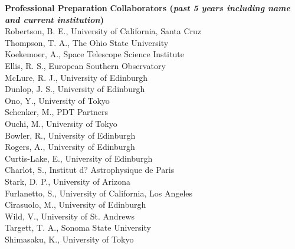 \documentclass[11pt,letterpaper,english]{article}
\begin{document}
\begin{flushleft} {\bf Professional Preparation}
\vspace{-6pt}
{\bf Collaborators ({\emph{past 5 years including name and current institution}})} 
{\parindent 16pt \\
Robertson, B. E., University of California, Santa Cruz \\
Thompson, T. A., The Ohio State University \\
Koekemoer, A., Space Telescope Science Institute \\
Ellis, R. S., European Southern Observatory \\
McLure, R. J., University of Edinburgh \\
Dunlop, J. S., University of Edinburgh \\
Ono, Y., University of Tokyo \\
Schenker, M., PDT Partners \\
Ouchi, M., University of Tokyo \\
Bowler, R., University of Edinburgh \\
Rogers, A., University of Edinburgh \\
Curtis-Lake, E., University of Edinburgh \\
Charlot, S., Institut d? Astrophysique de Paris \\
Stark, D. P., University of Arizona \\
Furlanetto, S., University of California, Los Angeles \\
Cirasuolo, M., University of Edinburgh \\
Wild, V., University of St. Andrews \\
Targett, T. A., Sonoma State University \\
Shimasaku, K., University of Tokyo \\
}


\end{flushleft}
\end{document}
